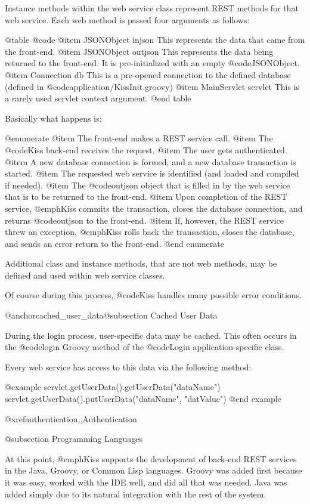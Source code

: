 Instance methods within the web service class represent REST methods
for that web service.  Each web method is passed four arguments as follows:

@table @code
@item JSONObject injson
This represents the data that came from the front-end.
@item JSONObject outjson
This represents the data being returned to the front-end.  It is pre-initialized with an empty @code{JSONObject}.
@item Connection db
This is a pre-opened connection to the defined database (defined in @code{application/KissInit.groovy})
@item MainServlet servlet
This is a rarely used servlet context argument.
@end table

Basically what happens is:

@enumerate
@item
The front-end makes a REST service call.
@item
The @code{Kiss} back-end receives the request.
@item
The user gets authenticated.
@item
A new database connection is formed, and a new database transaction is started.
@item
The requested web service is identified (and loaded and compiled if needed).
@item
The @code{outjson} object that is filled in by the web service that is to be returned to the front-end.
@item
Upon completion of the REST service, @emph{Kiss} commits the transaction, closes the database connection, and returns @code{outjson} to the front-end.
@item
If, however, the REST service threw an exception, @emph{Kiss} rolls back the transaction, closes the database, and sends an error return to the front-end.
@end enumerate

Additional class and instance methods, that are not web methods, may
be defined and used within web service classes.

Of course during this process, @code{Kiss} handles many possible error conditions.

@anchor{cached_user_data}@subsection Cached User Data

During the login process, user-specific data may be cached.  This
often occurs in the @code{login} Groovy method of the @code{Login}
application-specific class.

Every web service has access to this data via the following method:

@example
        servlet.getUserData().getUserData("dataName")
        servlet.getUserData().putUserData("dataName", "datValue")
@end example

@xref{authentication,,Authentication}

@subsection Programming Languages

At this point, @emph{Kiss} supports the development of back-end REST
services in the Java, Groovy, or Common Lisp languages.  Groovy was
added first because it was easy, worked with the IDE well, and did all
that was needed.  Java was added simply due to its natural integration
with the rest of the system.

